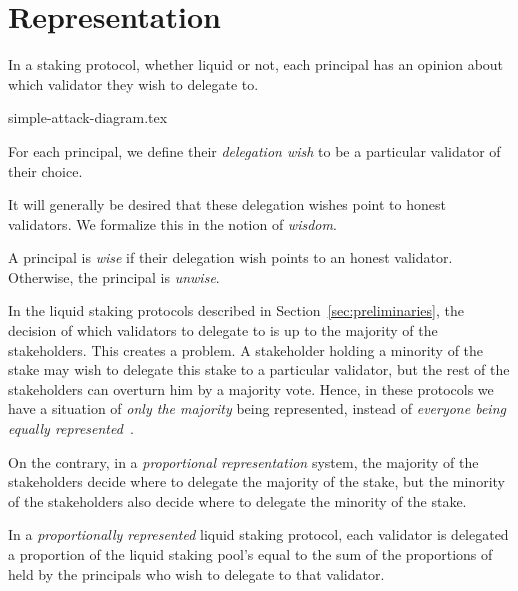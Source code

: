 \section{Representation}
In a staking protocol, whether liquid or not, each principal has an opinion
about which validator they wish to delegate to.

\ifccs
  {simple-attack-diagram.tex}
\fi

\begin{definition}
  For each principal, we define
  their \emph{delegation wish} to be a particular validator of their choice.
\end{definition}

It will generally be desired that these delegation wishes point to
honest validators. We formalize this in the notion of \emph{wisdom}.

\begin{definition}[Wisdom]
  A principal is \emph{wise} if their delegation wish points to an honest
  validator. Otherwise, the principal is \emph{unwise}.
\end{definition}

In the liquid staking protocols described in Section~\ref{sec:preliminaries},
the decision of which validators to delegate to is up to the majority of the
stakeholders.
This creates a problem. A stakeholder holding a minority of the stake
may wish to delegate this stake to a particular validator, but the rest
of the stakeholders can overturn him by a majority vote. Hence, in these
protocols we have a situation of \emph{only the majority} being represented,
instead of \emph{everyone being equally represented}~\cite{mill1862true}.

On the contrary, in a \emph{proportional representation} system, the
majority of the stakeholders decide where to delegate the majority of
the stake, but the minority of the stakeholders also decide where to delegate
the minority of the stake.


%
%
%
%
%
\begin{definition}
  In a \emph{proportionally represented} liquid staking protocol,
  each validator is delegated a proportion of the liquid staking pool's \asset
  equal to the sum of the proportions of \stasset held by the principals
  who wish to delegate to that validator.
\end{definition}

